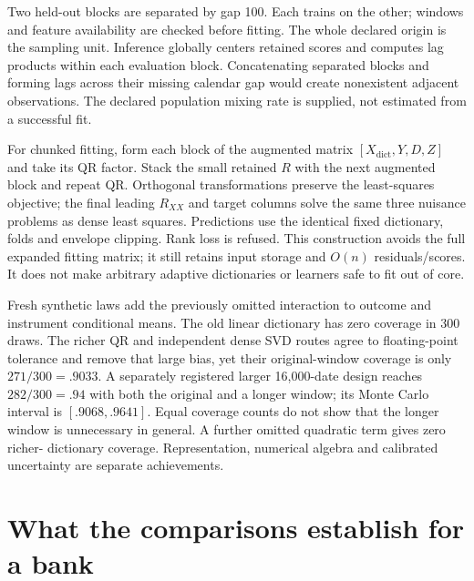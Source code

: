 Two held-out blocks are separated by gap 100. Each trains on the other; windows
and feature availability are checked before fitting. The whole declared origin
is the sampling unit. Inference globally centers retained scores and computes
lag products within each evaluation block. Concatenating separated blocks and
forming lags across their missing calendar gap would create nonexistent adjacent
observations. The declared population mixing rate is supplied, not estimated
from a successful fit.

For chunked fitting, form each block of the augmented matrix
$[X_{\mathrm{dict}},Y,D,Z]$ and take its QR factor. Stack the small retained
$R$ with the next augmented block and repeat QR. Orthogonal transformations
preserve the least-squares objective; the final leading $R_{XX}$ and target
columns solve the same three nuisance problems as dense least squares.
Predictions use the identical fixed dictionary, folds and envelope clipping.
Rank loss is refused. This construction avoids the full expanded fitting
matrix; it still retains input storage and $O(n)$ residuals/scores. It does not
make arbitrary adaptive dictionaries or learners safe to fit out of core.

Fresh synthetic laws add the previously omitted interaction to outcome and
instrument conditional means. The old linear dictionary has zero coverage in
300 draws. The richer QR and independent dense SVD routes agree to floating-point
tolerance and remove that large bias, yet their original-window coverage is
only $271/300=.9033$. A separately registered larger 16,000-date design reaches
$282/300=.94$ with both the original and a longer window; its Monte Carlo interval
is $[.9068,.9641]$. Equal coverage counts do not show that the longer window is
unnecessary in general. A further omitted quadratic term gives zero richer-
dictionary coverage. Representation, numerical algebra and calibrated
uncertainty are separate achievements.

\section{What the comparisons establish for a bank}
\label{r8:comparisons}



